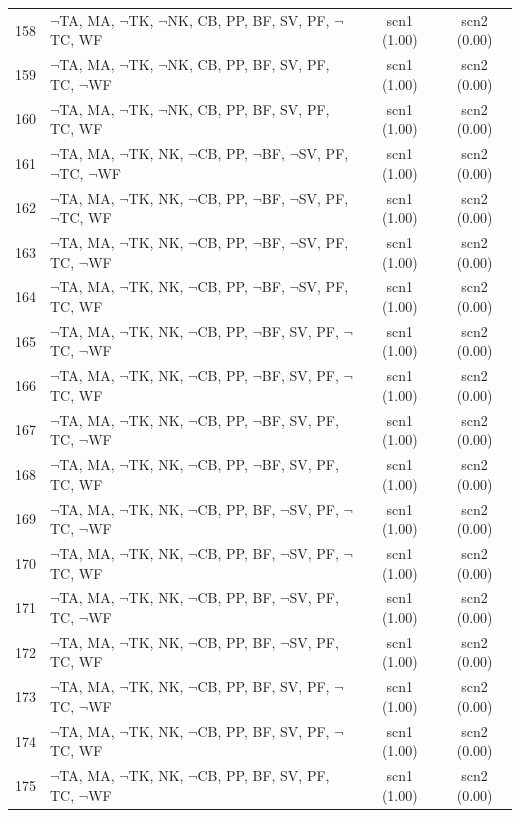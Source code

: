 \documentclass[12pt]{article}
\begin{document}
\begin{longtable}{|l|l|c|c|}
158 & $\neg$TA, MA, $\neg$TK, $\neg$NK, CB, PP, BF, SV, PF, $\neg$TC, WF & scn1 (1.00) & scn2 (0.00)\\
159 & $\neg$TA, MA, $\neg$TK, $\neg$NK, CB, PP, BF, SV, PF, TC, $\neg$WF & scn1 (1.00) & scn2 (0.00)\\
160 & $\neg$TA, MA, $\neg$TK, $\neg$NK, CB, PP, BF, SV, PF, TC, WF & scn1 (1.00) & scn2 (0.00)\\
161 & $\neg$TA, MA, $\neg$TK, NK, $\neg$CB, PP, $\neg$BF, $\neg$SV, PF, $\neg$TC, $\neg$WF & scn1 (1.00) & scn2 (0.00)\\
162 & $\neg$TA, MA, $\neg$TK, NK, $\neg$CB, PP, $\neg$BF, $\neg$SV, PF, $\neg$TC, WF & scn1 (1.00) & scn2 (0.00)\\
163 & $\neg$TA, MA, $\neg$TK, NK, $\neg$CB, PP, $\neg$BF, $\neg$SV, PF, TC, $\neg$WF & scn1 (1.00) & scn2 (0.00)\\
164 & $\neg$TA, MA, $\neg$TK, NK, $\neg$CB, PP, $\neg$BF, $\neg$SV, PF, TC, WF & scn1 (1.00) & scn2 (0.00)\\
165 & $\neg$TA, MA, $\neg$TK, NK, $\neg$CB, PP, $\neg$BF, SV, PF, $\neg$TC, $\neg$WF & scn1 (1.00) & scn2 (0.00)\\
166 & $\neg$TA, MA, $\neg$TK, NK, $\neg$CB, PP, $\neg$BF, SV, PF, $\neg$TC, WF & scn1 (1.00) & scn2 (0.00)\\
167 & $\neg$TA, MA, $\neg$TK, NK, $\neg$CB, PP, $\neg$BF, SV, PF, TC, $\neg$WF & scn1 (1.00) & scn2 (0.00)\\
168 & $\neg$TA, MA, $\neg$TK, NK, $\neg$CB, PP, $\neg$BF, SV, PF, TC, WF & scn1 (1.00) & scn2 (0.00)\\
169 & $\neg$TA, MA, $\neg$TK, NK, $\neg$CB, PP, BF, $\neg$SV, PF, $\neg$TC, $\neg$WF & scn1 (1.00) & scn2 (0.00)\\
170 & $\neg$TA, MA, $\neg$TK, NK, $\neg$CB, PP, BF, $\neg$SV, PF, $\neg$TC, WF & scn1 (1.00) & scn2 (0.00)\\
171 & $\neg$TA, MA, $\neg$TK, NK, $\neg$CB, PP, BF, $\neg$SV, PF, TC, $\neg$WF & scn1 (1.00) & scn2 (0.00)\\
172 & $\neg$TA, MA, $\neg$TK, NK, $\neg$CB, PP, BF, $\neg$SV, PF, TC, WF & scn1 (1.00) & scn2 (0.00)\\
173 & $\neg$TA, MA, $\neg$TK, NK, $\neg$CB, PP, BF, SV, PF, $\neg$TC, $\neg$WF & scn1 (1.00) & scn2 (0.00)\\
174 & $\neg$TA, MA, $\neg$TK, NK, $\neg$CB, PP, BF, SV, PF, $\neg$TC, WF & scn1 (1.00) & scn2 (0.00)\\
175 & $\neg$TA, MA, $\neg$TK, NK, $\neg$CB, PP, BF, SV, PF, TC, $\neg$WF & scn1 (1.00) & scn2 (0.00)\\

\end{longtable}
\end{document}
